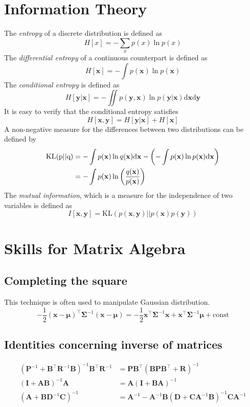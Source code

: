 \documentclass[a4paper]{report}
\newcommand{\ud}{\mathrm{d}}
\renewcommand{\bf}{\mathbf}
\newcommand{\imp}[1]{{\color{blue}\textit{#1}}}
\newcommand{\bs}{\boldsymbol}
\begin{document}
\section{Information Theory}
The \imp{entropy} of a discrete distribution is defined as
\begin{equation}
	H[x] = -\sum_x p(x) \ln p(x)
\end{equation}
The \imp{differential entropy} of a continuous counterpart is defined as
\begin{equation}
	H[\bf{x}]=-\int p(\bf{x})\ln p(\bf{x})
\end{equation}
The \imp{conditional entropy} is defined as
\begin{equation}
	H[\bf{y}|\bf{x}] = -\iint p(\bf{y},\bf{x}) \ln p(\bf{y}|\bf{x}) \ud \bf{x} \ud \bf{y}
\end{equation}
It is easy to verify that the conditional entropy satisfies
\begin{equation}
	H[\bf{x},\bf{y}] = H[\bf{y}|\bf{x}] + H[\bf{x}]
\end{equation} 
A non-negative measure for the differences between two distributions can be defined by
\begin{align}
\rm{KL}(p||q)&=	-\int p(\bf{x}) \ln q(\bf{x}) \ud \bf{x} - \left(-\int p(\bf{x})\ln p(\bf{x})\ud \bf{x}\right)\notag \\
&= -\int p(\bf{x}) \ln \left(\frac{q(\bf{x})}{p(\bf{x})}\right)
\end{align}
The \imp{mutual information}, which is a measure for the independence of two variables is defined as
\begin{equation}
	I[\bf{x},\bf{y}] = \mathrm{KL}(p(\bf{x},\bf{y})||p(\bf{x})p(\bf{y}))
\end{equation}
\section{Skills for Matrix Algebra}
\subsection{Completing the square}
This technique is often used to manipulate Gaussian distribution.
\begin{equation}
	-\frac{1}{2}(\bf{x}-\bs{\mu})^{\intercal}\bs{\Sigma}^{-1}(\bf{x}-\bs{\mu})=-\frac{1}{2}\bf{x}^{\intercal}\bs{\Sigma}^{-1}\bf{x}+\bf{x}^{\intercal}\bs{\Sigma}^{-1}\bs{\mu}+\text{const}
\end{equation}
\subsection{Identities concerning inverse of matrices}
\begin{align}
	(\bf{P}^{-1}+\bf{B}^{\intercal}\bf{R}^{-1}\bf{B})^{-1}\bf{B}^{\intercal}\bf{R}^{-1}&=\bf{PB}^{\intercal}(\bf{BPB}^{\intercal}+\bf{R})^{-1} \label{ide0}\\
	(\bf{I+AB})^{-1}\bf{A} &= \bf{A}(\bf{I+BA})^{-1}\\
	(\bf{A+B}\bf{D}^{-1}\bf{C})^{-1} &= \bf{A}^{-1}-\bf{A}^{-1}\bf{B}(\bf{D}+\bf{CA}^{-1}\bf{B})^{-1}\bf{CA}^{-1} \label{ide1}
\end{align}
\end{document}
